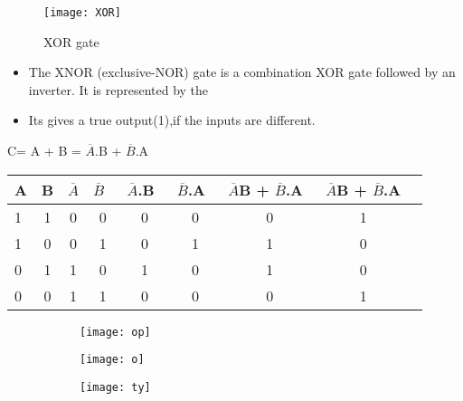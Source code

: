 \documentclass{article}
\begin{document}
\begin{figure}[h!]
	\texttt{[image: XOR]}
	\caption{XOR gate}
\end{figure}
\begin{itemize}
	\item The XNOR (exclusive-NOR) gate is a combination XOR gate followed by an inverter. It is represented by the 
	\item Its gives  a true output(1),if the inputs are different.
	
\end{itemize}
\begin{center}
	C= A +  B = $\overline{A}$.B + $\overline{B}$.A
\end{center}
\begin{table}[h!]
	\begin{center}
		\begin{tabular}{|l|c|c|c|c|c|c|c|c|}
			\cellcolor{blue!35}\textbf{A} & \cellcolor{blue!35}\textbf{B} & \cellcolor{blue!35}\textbf{$\overline{A}$} & \cellcolor{blue!35}\textbf{$\overline{B}$}\ &
			\cellcolor{blue!35}\textbf{$\overline{A}$.B}\ &
			\cellcolor{blue!35}\textbf{$\overline{B}$.A}\ & 
			\cellcolor{blue!35}\textbf{$\overline{A}$B + $\overline{B}$.A}\ &
			\cellcolor{blue!35}\textbf{$\overline{A}$B + $\overline{B}$.A}\\
			\hline
			\cellcolor{blue!15}	1 & \cellcolor{blue!15}1 & \cellcolor{blue!15}0 & \cellcolor{blue!15}0 & \cellcolor{blue!15}0 & \cellcolor{blue!15}0 & \cellcolor{blue!15}0 & \cellcolor{blue!15}1\\
			\cellcolor{blue!15}	1 & \cellcolor{blue!15} 0 & \cellcolor{blue!15}0 & \cellcolor{blue!15}1 & \cellcolor{blue!15}0 & \cellcolor{blue!15}1 & \cellcolor{blue!15}1 & \cellcolor{blue!15}0\\
			\cellcolor{blue!15}	0 & \cellcolor{blue!15}1 & \cellcolor{blue!15}1 & 	\cellcolor{blue!15}0 & \cellcolor{blue!15}1 & \cellcolor{blue!15}0 & \cellcolor{blue!15}1 &  \cellcolor{blue!15}0\\
			\cellcolor{blue!15}	0 & \cellcolor{blue!15}0 & \cellcolor{blue!15}1 & 	\cellcolor{blue!15}1 & \cellcolor{blue!15}0 & \cellcolor{blue!15}0 & \cellcolor{blue!15}0 & \cellcolor{blue!15}1\\
			\hline	
		\end{tabular}
	\end{center}
\end{table}
\begin{figure}[h!]
	\centering
	\begin{subfigure}[h!]{0.3\linewidth}
		
		\texttt{[image: op]} \end{subfigure}
	\begin{subfigure}[h!]{0.1\linewidth}
		\texttt{[image: o]}
	\end{subfigure}
	\begin{subfigure}[h!]{0.3\linewidth}
		\texttt{[image: ty]}
	\end{subfigure}
\end{figure}
\end{document}
